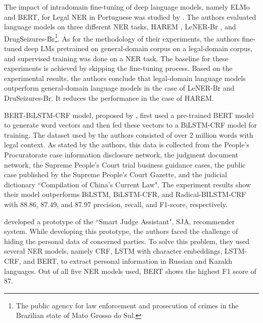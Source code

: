 \documentclass[a4paper,twoside]{article}
\begin{document}
The impact of intradomain fine-tuning of deep language models, namely ELMo \cite{sarzynska2021detecting} and BERT, for Legal NER in Portuguese was studied by \cite{bonifacio2020study}. The authors evaluated language models on three different NER tasks, HAREM \cite{freitas2010second}, LeNER-Br \cite{luz2018lener}, and DrugSeizures-Br\footnote{The public agency for law enforcement and prosecution of crimes in the Brazilian state of Mato Grosso do Sul.}. As for the methodology of their experiments, the authors fine-tuned deep LMs pretrained on general-domain corpus on a legal-domain corpus, and supervised training was done on a NER task. The baseline for these experiments is achieved by skipping the fine-tuning process. Based on the experimental results, the authors conclude that legal-domain language models outperform general-domain language models in the case of LeNER-Br and DruSeizures-Br. It reduces the performance in the case of HAREM.

BERT-BiLSTM-CRF model, proposed by \cite{gu2020named}, first used a pre-trained BERT model to generate word vectors and then fed these vectors to a BiLSTM-CRF model for training. The dataset used by the authors consisted of over 2 million words with legal context. As stated by the authors, this data is collected from the People's Procuratorate case information disclosure network, the judgment document network, the Supreme People's Court trial business guidance cases, the public case published by the Supreme People's Court Gazette, and the judicial dictionary ``Compilation of China's Current Law". The experiment results show their model outperforms BiLSTM, BiLSTM-CFR, and Radical-BILSTM-CRF with 88.86, 87.49, and 87.97 precision, recall, and F1-score, respectively.

\cite{aibek2020named} developed a prototype of the ``Smart Judge Assistant", SJA, recommender system. While developing this prototype, the authors faced the challenge of hiding the personal data of concerned parties. To solve this problem, they used several NER models, namely CRF, LSTM with character embeddings, LSTM-CRF, and BERT, to extract personal information in Russian and Kazakh languages. Out of all five NER models used, BERT shows the highest F1 score of 87.

\end{document}
